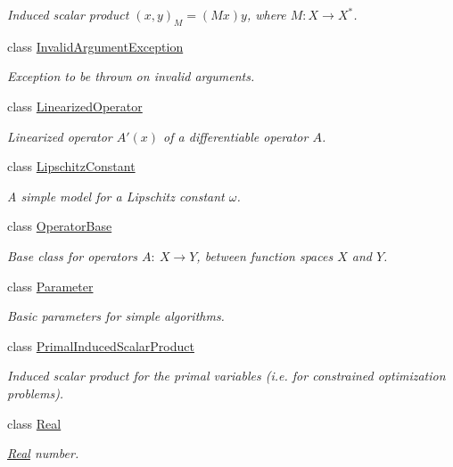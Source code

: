 \begin{DoxyCompactItemize}
\begin{DoxyCompactList}\small\item\em Induced scalar product $(x,y)_M = (Mx)y$, where $M:X\rightarrow X^*$. \end{DoxyCompactList}\item 
class \hyperlink{classSpacy_1_1InvalidArgumentException}{Invalid\+Argument\+Exception}
\begin{DoxyCompactList}\small\item\em Exception to be thrown on invalid arguments. \end{DoxyCompactList}\item 
class \hyperlink{classSpacy_1_1LinearizedOperator}{Linearized\+Operator}
\begin{DoxyCompactList}\small\item\em Linearized operator $A'(x)$ of a differentiable operator $A$. \end{DoxyCompactList}\item 
class \hyperlink{classSpacy_1_1LipschitzConstant}{Lipschitz\+Constant}
\begin{DoxyCompactList}\small\item\em A simple model for a Lipschitz constant $\omega$. \end{DoxyCompactList}\item 
class \hyperlink{classSpacy_1_1OperatorBase}{Operator\+Base}
\begin{DoxyCompactList}\small\item\em Base class for operators $A:\ X\rightarrow Y$, between function spaces $X$ and $Y$. \end{DoxyCompactList}\item 
class \hyperlink{classSpacy_1_1Parameter}{Parameter}
\begin{DoxyCompactList}\small\item\em Basic parameters for simple algorithms. \end{DoxyCompactList}\item 
class \hyperlink{classSpacy_1_1PrimalInducedScalarProduct}{Primal\+Induced\+Scalar\+Product}
\begin{DoxyCompactList}\small\item\em Induced scalar product for the primal variables (i.\+e. for constrained optimization problems). \end{DoxyCompactList}\item 
class \hyperlink{classSpacy_1_1Real}{Real}
\begin{DoxyCompactList}\small\item\em \hyperlink{classSpacy_1_1Real}{Real} number. \end{DoxyCompactList}\item 

\end{DoxyCompactItemize}
